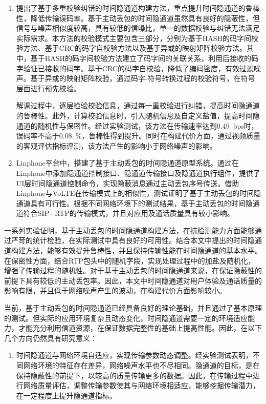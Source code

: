 \begin{conclusion}
\begin{enumerate}
    \item
    提出了基于多重校验纠错的时间隐通道构建方法，重点提升时间隐通道的鲁棒性，降低传输误码率。基于主动丢包的时间隐通道虽然具有良好的隐蔽性，但信号与噪声相似度较高，具有较低的信噪比，单一的数据校验与纠错无法满足实际需求。本方法的校验模式主要包含三部分，分别为基于HASH的码字间校验方法、基于CRC的码字自校验方法以及基于异或的映射矩阵校验方法。其中，基于HASH的码字间校验方法建立了码字间的关联关系，利用后接收的码字验证已接收的码字。基于CRC的码字自校验，降低了编码密度，有效过滤噪声。基于异或的映射矩阵校验，通过码字-符号转换过程的校验符号，在符号层面进行预先校验。
    
    解调过程中，逐层检验校验信息，通过每一重校验进行纠错，提高时间隐通道的鲁棒性。此外，计算校验信息时，引入随机信息及自定义盐值，提高时间隐通道的随机性与保密性。经过实验测试，该方法在传输速率达到{0.49\ bps}时，误码率不高于{0.08\ \%}，鲁棒性得到提升。同时在构建代价方面，通过视频质量的客观评估指标评测，该方法产生的影响小于网络噪声的影响。

    \item
    Linphone平台中，搭建了基于主动丢包的时间隐通道原型系统。通过在Linphone中添加隐通道控制接口、隐通道传输接口及隐通道执行组件，提供了UI层时间隐通道控制命令，实现隐蔽消息通过主动丢包序号传送。借助Linphone与VoLTE在传输模式上的相似性，测试证明了基于主动丢包的时间隐通道具有可行性。根据不同网络环境下的测试结果，基于主动丢包的时间隐通道符合SIP+RTP的传输模式，并且对应用及通话质量具有较小影响。
\end{enumerate}

一系列实验证明，基于主动丢包的时间隐通道构建方法，在抗检测能力方面能够通过严苛的统计检验，在实际测试中具有良好的可用性。结合本文中提出的时间隐通道构建方法，能够有效提升鲁棒性，并且保持传输性能在时间隐通道的基本水平。在保密性方面，结合RTP包头中的随机字段，实现处理过程中的加盐及随机化，增强了传输过程的随机性。对于基于主动丢包的时间隐通道来说，在保证隐蔽性的前提下具有较低的主动丢包率。因此，本文中时间隐通道对用户体验及通话质量的影响有限，并且低于网络噪声产生的波动，在构建代价方面影响较小。

当前，基于主动丢包的时间隐通道已经具备良好的理论基础，并且通过了基本原理的测试。但实际的应用环境复杂且动态变化，时间隐通道需要一定的环境适应能力，才能充分利用信道资源，在保证数据完整性的基础上提高性能。因此，在以下几个方向仍然具有研究意义：
\begin{enumerate}
    \item
    时间隐通道与网络环境自适应，实现传输参数动态调整。经实验测试表明，不同网络环境的特征存在差异，网络噪声水平也不尽相同。隐通道的目标，是在保持隐蔽性的前提下，以较高的质量传输更多的数据。因此，在传输过程中进行网络质量评估，调整传输参数使其与网络环境相适应，能够挖掘传输潜力，在一定程度上提升隐通道指标。
    

\end{enumerate}
\end{conclusion}
